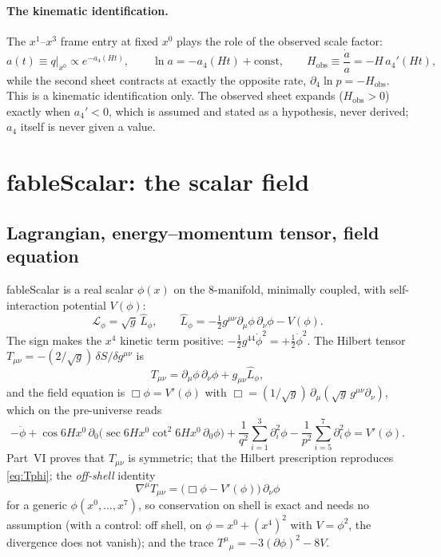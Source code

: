 \documentclass[11pt,a4paper]{article}
\newcommand{\fableScalar}{\textsf{fableScalar}}
\newcommand{\Lhat}{\hat{L}}
\newcommand{\sgn}{\sqrt{g}}
\newcommand{\Hobs}{H_{\mathrm{obs}}}
\begin{document}
\paragraph{The kinematic identification.} The $x^1$--$x^3$ frame entry at fixed $x^0$ plays the
role of the observed scale factor:
\begin{equation}\label{eq:kinematic}
  a(t)\equiv q\big|_{x^0}\propto e^{-a_4(Ht)},\qquad \ln a=-a_4(Ht)+\text{const},\qquad
  \Hobs\equiv\frac{\dot a}{a}=-H\,a_4'(Ht),
\end{equation}
while the second sheet contracts at exactly the opposite rate, $\partial_4\ln p=-\Hobs$. This is
a kinematic identification only. The observed sheet expands ($\Hobs>0$) exactly when $a_4'<0$,
which is assumed and stated as a hypothesis, never derived; $a_4$ itself is never given a value.

\section{\fableScalar: the scalar field}\label{sec:scalar}

\subsection{Lagrangian, energy--momentum tensor, field equation}

\fableScalar{} is a real scalar $\phi(x)$ on the 8-manifold, minimally coupled, with
self-interaction potential $V(\phi)$:
\begin{equation}\label{eq:Lphi}
  \mathcal{L}_\phi=\sgn\,\Lhat_\phi,\qquad
  \Lhat_\phi=-\tfrac12 g^{\mu\nu}\partial_\mu\phi\,\partial_\nu\phi-V(\phi).
\end{equation}
The sign makes the $x^4$ kinetic term positive: $-\tfrac12g^{44}\dot\phi^2=+\tfrac12\dot\phi^2$.
The Hilbert tensor $T_{\mu\nu}=-(2/\sgn)\,\delta S/\delta g^{\mu\nu}$ is
\begin{equation}\label{eq:Tphi}
  T_{\mu\nu}=\partial_\mu\phi\,\partial_\nu\phi+g_{\mu\nu}\Lhat_\phi ,
\end{equation}
and the field equation is $\Box\phi=V'(\phi)$ with
$\Box=(1/\sgn)\,\partial_\mu(\sgn\,g^{\mu\nu}\partial_\nu)$, which on the pre-universe reads
\begin{equation}\label{eq:boxphi}
  -\ddot\phi+\cos 6Hx^0\,\partial_0\!\bigl(\sec 6Hx^0\cot^2 6Hx^0\,\partial_0\phi\bigr)
  +\frac{1}{q^2}\sum_{i=1}^{3}\partial_i^2\phi-\frac{1}{p^2}\sum_{i=5}^{7}\partial_i^2\phi=V'(\phi).
\end{equation}
Part~VI proves that $T_{\mu\nu}$ is symmetric; that the Hilbert prescription reproduces
\eqref{eq:Tphi}; the \emph{off-shell} identity
\begin{equation}\label{eq:offshell}
  \nabla^\mu T_{\mu\nu}=\bigl(\Box\phi-V'(\phi)\bigr)\,\partial_\nu\phi
\end{equation}
for a generic $\phi(x^0,\dots,x^7)$, so conservation on shell is exact and needs no assumption
(with a control: off shell, on $\phi=x^0+(x^4)^2$ with $V=\phi^2$, the divergence does not vanish);
and the trace $T^\mu{}_\mu=-3(\partial\phi)^2-8V$.
\end{document}
